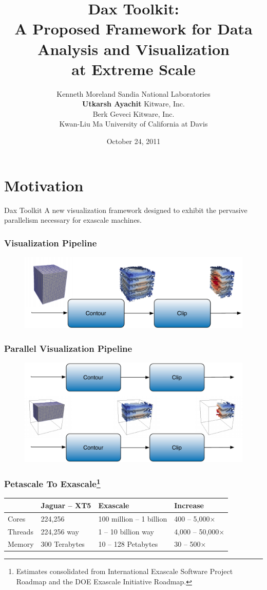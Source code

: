 \documentclass[brown]{beamer}
\title{\textbf{Dax Toolkit}: \\
  A Proposed Framework for Data Analysis and Visualization \\
  at Extreme Scale}
\author{\small
  Kenneth Moreland {\tiny Sandia National Laboratories} \\
  \textbf{Utkarsh Ayachit} {\tiny Kitware, Inc. } \\
  Berk Geveci {\tiny Kitware, Inc. }\\
  Kwan-Liu Ma {\tiny University of California at Davis}
}
\date {October 24, 2011}
\begin{document}
\frame{\titlepage}

\section{Motivation}

\frame
{
  \begin{beamerboxesrounded}{Dax Toolkit}
  A new visualization framework designed to exhibit the pervasive parallelism
    necessary for exascale machines.
  \end{beamerboxesrounded}
}

\frame
{
  \frametitle{Visualization Pipeline}
  \begin{figure}
  \centering
  \includegraphics[width=.8\textwidth]{images/SimplePipeline.pdf}
  \end{figure}
}

\frame
{
  \frametitle{Parallel Visualization Pipeline}
  \begin{figure}
  \centering
  \includegraphics[width=.8\textwidth]{images/ParallelVisPipeline.pdf}
  \end{figure}
}


\frame
{
  \frametitle{Petascale To Exascale\footnote[1]{Estimates consolidated from International
  Exascale Software Project Roadmap and the DOE Exascale Initiative Roadmap.}}
  \renewcommand{\arraystretch}{1.5}
  \begin{table}[htbp]
    \centering
    \begin{tabular}{l|l|l|l}
      & Jaguar -- XT5 & Exascale & Increase \\
      \hline
      Cores & 224,256
      & 100 million -- 1 billion
      & 400 -- 5,000$\times$ \\
      Threads & 224,256 way
      & 1 -- 10 billion way
      & 4,000 -- 50,000$\times$ \\
      Memory & 300 Terabytes
      & 10 -- 128  Petabytes
      & 30 -- 500$\times$
    \end{tabular}
  \end{table}
}
\end{document}
